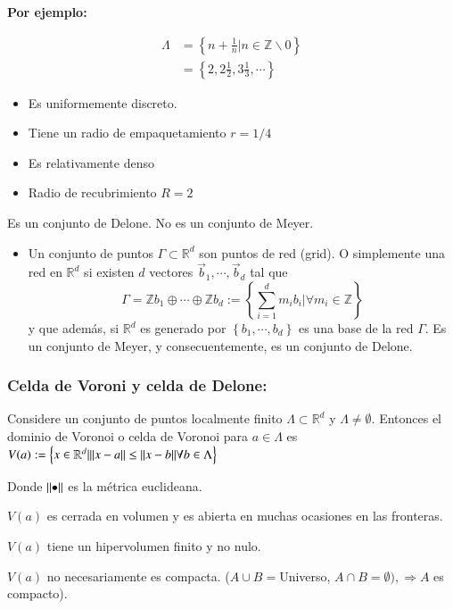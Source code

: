 \textbf{Por ejemplo:}

\begin{align*}
    \Lambda&=\left\{n+\frac{1}{n}\rvert n \in \mathbb{Z}\backslash 0\right\}\\
        &=\left\{2,2\frac{1}{2},3\frac{1}{3},\cdots\right\}
\end{align*}

\begin{itemize}
    \item Es uniformemente discreto.
    \item Tiene un radio de empaquetamiento $r=1/4$
    \item Es relativamente denso
    \item Radio de recubrimiento $R=2$
\end{itemize}

Es un conjunto de Delone.
No es un conjunto de Meyer.

\begin{itemize}
    \item Un conjunto de puntos $\Gamma \subset \mathbb{R}^d$ son puntos de red (grid). O simplemente una red en $\mathbb{R}^d$ si existen $d$ vectores $\vec{b}_1,\cdots,\vec{b}_d$ tal que
    $$
        \Gamma=\mathbb{Z}b_1\oplus\cdots\oplus\mathbb{Z}b_d:=\left\{\sum_{i=1}^dm_ib_i\lvert\forall m_i\in\mathbb{Z}\right\}
    $$
    y que además, si $\mathbb{R}^d$ es generado por $\left\{b_1,\cdots,b_d\right\}$ es una base de la red $\Gamma$. Es un conjunto de Meyer, y consecuentemente, es un conjunto de Delone.
\end{itemize}

\subsubsection{Celda de Voroni y celda de Delone:}

Considere un conjunto de puntos localmente finito $\Lambda\subset \mathbb{R}^d$ y $\Lambda\neq\emptyset$. Entonces el dominio de Voronoi o celda de Voronoi para $a\in\Lambda$ es $V(a):=\left\{x\in\mathbb{R}^d\vert\norm{x-a}\leq\norm{x-b}\forall b\in\Lambda\right\} $

Donde $\norm{\bullet}$ es la métrica euclideana.

$V(a)$ es cerrada en volumen y es abierta en muchas ocasiones en las fronteras.

$V(a)$ tiene un hipervolumen finito y no nulo.

$V(a)$ no necesariamente es compacta. ($A\cup B=$Universo, $A\cap B=\emptyset),\Rightarrow A$ es compacto).

